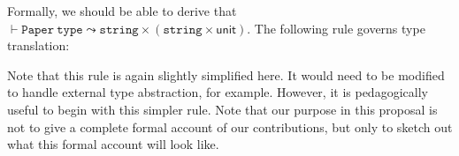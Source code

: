Formally, we should be able to derive that $\vdash \texttt{Paper}~\mathtt{type} \leadsto \texttt{string} \times (\texttt{string} \times \mathsf{unit})$. The following rule governs type translation:
\begin{mathpar}
\end{mathpar}
Note that this rule is again slightly simplified here. It would need to be modified to handle external type abstraction, for example. However, it is pedagogically useful to begin with this simpler rule. Note that our purpose in this proposal is not to give a complete formal account of our contributions, but only to sketch out what this formal account will look like. 

